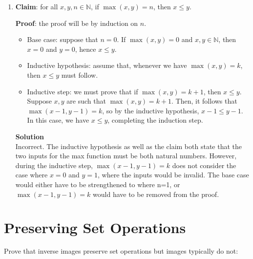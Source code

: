 \documentclass[11pt]{article}
\newcommand*{\Question}[1]{\vfill\pagebreak[3]\section{#1}}
\newenvironment{Parts}{\begin{enumerate}[label=(\alph*)]}{\end{enumerate}}
\newcommand*{\Part}{\item}
\newcommand*{\N}{\mathbb{N}}
\begin{document}
\begin{Parts}
\Part \textbf{Claim}: for all $x,y,n\in\N$, if $\max(x,y)=n$, then $x\leq y$.

\textbf{Proof}: the proof will be by induction on $n$.
\begin{itemize}
\item Base case: suppose that $n=0$. If $\max(x,y)=0$ and $x,y\in\N$, then $x=0$ and $y=0$, hence $x\leq y$.
\item Inductive hypothesis: assume that, whenever we have $\max(x,y)=k$, then $x\leq y$ must follow.
\item Inductive step: we must prove that if $\max(x,y)=k+1$, then $x\leq y$. Suppose $x,y$ are such that $\max(x,y)=k+1$. Then, it follows that $\max(x-1,y-1)=k$, so by the inductive hypothesis, $x-1\leq y-1$. In this case, we have $x\leq y$, completing the induction step.
\end{itemize}

\begin{mdframed} \textbf{Solution} \\
Incorrect. The inductive hypothesis as well as the claim both state that the two inputs for the max function must be both natural numbers. However, during the inductive step, $\max(x-1,y-1)=k$ does not consider the case where $x=0$ and $y=1$, where the inputs would be invalid. The base case would either have to be strengthened to where n=1, or $\max(x-1,y-1)=k$ would have to be removed from the proof. 
\end{mdframed}

\end{Parts}


\Question{Preserving Set Operations}

Prove that inverse images preserve set operations but images typically do not:
\end{document}
